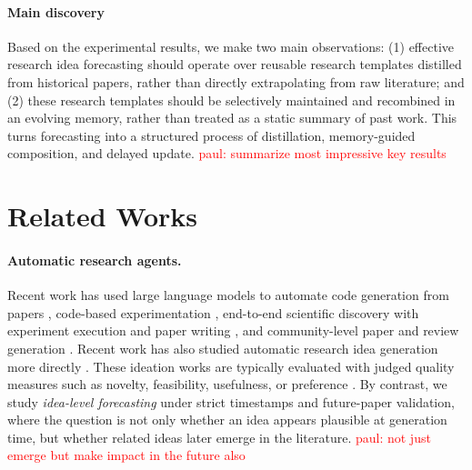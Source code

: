 \documentclass{article} %
\newcommand{\paul}[1]{\textcolor{red}{paul: #1}}
\begin{document}
\vspace{-2mm}
\paragraph{Main discovery} Based on the experimental results, we make two main observations: (1) effective research idea forecasting should operate over reusable research templates distilled from historical papers, rather than directly extrapolating from raw literature; and (2) these research templates should be selectively maintained and recombined in an evolving memory, rather than treated as a static summary of past work. This turns forecasting into a structured process of distillation, memory-guided composition, and delayed update. \paul{summarize most impressive key results}


\section{Related Works}

\paragraph{Automatic research agents.}
Recent work has used large language models to automate code generation from papers \citep{li2025papercoder}, code-based experimentation \citep{jansen2025codescientist}, end-to-end scientific discovery with experiment execution and paper writing \citep{lu2024aiscientist}, and community-level paper and review generation \citep{yu2024researchtown}. Recent work has also studied automatic research idea generation more directly \citep{baek-etal-2025-researchagent,si2025novel,zhao2025ramon}. These ideation works are typically evaluated with judged quality measures such as novelty, feasibility, usefulness, or preference \citep{guo2024ideabench,liu2025hypobench}. By contrast, we study \emph{idea-level forecasting} under strict timestamps and future-paper validation, where the question is not only whether an idea appears plausible at generation time, but whether related ideas later emerge in the literature. \paul{not just emerge but make impact in the future also}

\vspace{-2mm}
\end{document}
